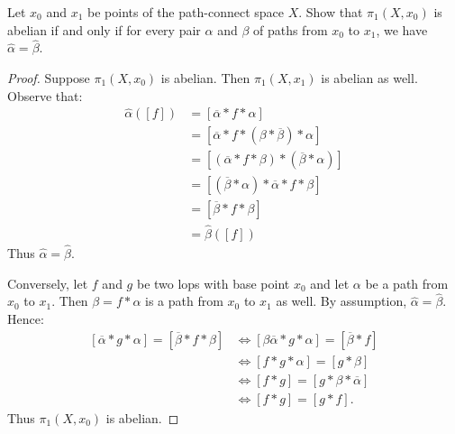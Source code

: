 \documentclass[10pt,oneside,openany]{memoir}
\begin{document}
\begin{exercise}
Let $x_0$ and $x_1$ be points of the path-connect space $X$. Show that $\pi_1(X,x_0)$ is abelian if and only if for every pair $\alpha$ and $\beta$ of paths from $x_0$ to $x_1$, we have $\hat{\alpha} = \hat{\beta}$.
\end{exercise}
    \begin{proof}
        Suppose $\pi_1(X,x_0)$ is abelian. Then  $\pi_1(X,x_1)$ is abelian as well. Observe that:
            \begin{equation*}
            \begin{split}
                \hat{\alpha}([f]) 
                & = [\overline{\alpha} \ast f \ast \alpha] \\
                & = [\overline{\alpha} \ast f \ast (\beta \ast \overline{\beta}) \ast \alpha] \\
                & = [(\overline{\alpha} \ast f \ast \beta) \ast (\overline{\beta} \ast \alpha)] \\
                & = [(\overline{\beta} \ast \alpha) \ast \overline{\alpha} \ast f \ast \beta] \\
                & = [\overline{\beta} \ast f \ast \beta] \\
                & = \hat{\beta}([f]) 
            \end{split}
            \end{equation*}
        Thus $\hat{\alpha} = \hat{\beta}$.

        Conversely, let $f$ and $g$ be two lops with base point $x_0$ and let $\alpha$ be a path from $x_0$ to $x_1$. Then $\beta = f \ast \alpha$ is a path from $x_0$ to $x_1$ as well. By assumption, $\hat{\alpha} = \hat{\beta}$. Hence:
            \begin{equation*}
            \begin{split}
                [\overline{\alpha} \ast g \ast \alpha] = [\overline{\beta} \ast f \ast \beta] 
                & \iff [ \beta \overline{\alpha} \ast g \ast \alpha] = [\overline{\beta} \ast f ] \\
                & \iff [f \ast g \ast \alpha] = [g \ast \beta] \\
                & \iff [f \ast g] = [g \ast \beta \ast \overline{\alpha}] \\
                & \iff [f \ast g] = [g \ast f].
            \end{split}
            \end{equation*}
        Thus $\pi_1(X,x_0)$ is abelian.
    \end{proof}
\end{document}
